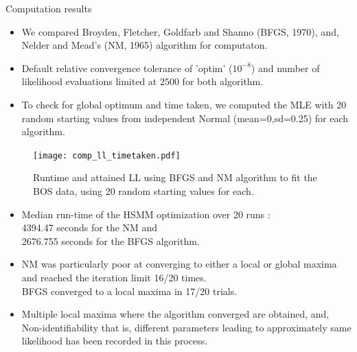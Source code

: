 \documentclass{beamer}
\begin{document}
\begin{frame}{Computation results}
\begin{itemize}
\item We compared Broyden, Fletcher, Goldfarb and Shanno (BFGS, 1970), and, Nelder and Mead's (NM, 1965) algorithm for computaton.
\vspace{2mm}
\item Default relative convergence tolerance of 'optim' ($10^{-8}$) and number of likelihood evaluations limited at $2500$ for both algorithm.
\vspace{2mm}
\item To check for global optimum and time taken, we computed the MLE with 20 random starting values from independent Normal (mean=0,sd=0.25) for each algorithm.
\end{itemize}
\end{frame}
\begin{frame}
\begin{figure}[t]\label{fig:comp_ll}
\centering
\texttt{[image: comp\_ll\_timetaken.pdf]}
\caption{Runtime and attained LL using BFGS and NM algorithm to fit the BOS data, using 20 random starting values for each.}
\end{figure}
\end{frame}
\begin{frame}
\begin{itemize}
\item Median run-time of the HSMM optimization over 20 runs :\\ \vspace{2mm} 4394.47 seconds for the NM and\\ \vspace{2mm} 2676.755 seconds for the BFGS algorithm.
\vspace{3mm}
\item NM was particularly poor at converging to either a local or global maxima and reached the iteration limit 16/20 times.\\ \vspace{2mm} BFGS converged to a local maxima in 17/20 trials.
\vspace{3mm}
\item Multiple local maxima where the algorithm converged are obtained, and, \\ \vspace{2mm} Non-identifiability that is, different parameters leading to approximately same likelihood has been recorded in this process.
\end{itemize}
\end{frame}
\end{document}

